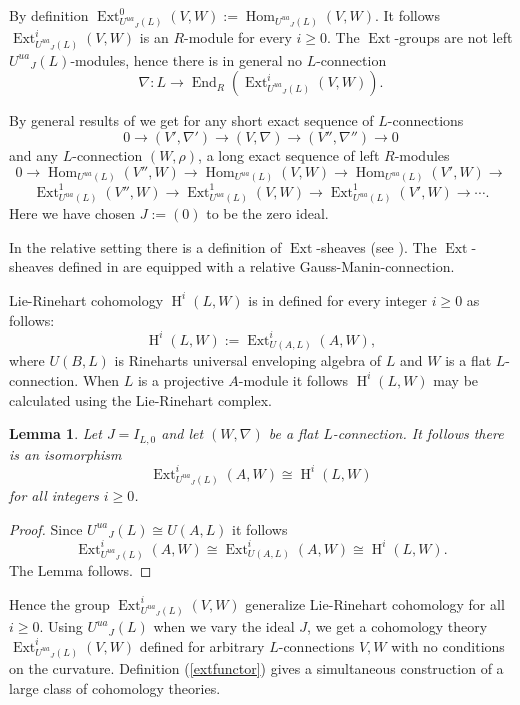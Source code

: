 \documentclass{amsart}
\theoremstyle{plain}
\newtheorem{lemma}[theorem]{Lemma}
\theoremstyle{definition}
\theoremstyle{remark}
\numberwithin{equation}{theorem}
\begin{document}
By definition ${\operatorname{Ext} }^0_{{U^{ua}}_J(L)}(V,W):={\operatorname{Hom} }_{{U^{ua}}_J(L)}(V,W)$.
It follows ${\operatorname{Ext} }^i_{{U^{ua}}_J(L)}(V,W)$ is an ${R}$-module for every $i\geq 0$. 
The ${\operatorname{Ext} }$-groups are not left ${U^{ua}}_J(L)$-modules, hence there is in general no $L$-connection
\[ \nabla:L\rightarrow {\operatorname{End} }_{R}({\operatorname{Ext} }^i_{{U^{ua}}_J(L)}(V,W)).\]

By general results of \cite{cartan} we get for any short exact sequence of $L$-connections
\[ 0 \rightarrow (V', \nabla') \rightarrow (V,\nabla) \rightarrow (V'', \nabla'') \rightarrow 0\]
and any $L$-connection $(W, \rho)$, a long exact sequence of left ${R}$-modules
\[ 0 \rightarrow {\operatorname{Hom} }_{{U^{ua}}(L)}(V'',W)\rightarrow {\operatorname{Hom} }_{{U^{ua}}(L)}(V,W)
\rightarrow {\operatorname{Hom} }_{{U^{ua}}(L)}(V',W)\rightarrow \]
\[ {\operatorname{Ext} }^1_{{U^{ua}}(L)}(V'', W)\rightarrow {\operatorname{Ext} }^1_{{U^{ua}}(L)}(V,W)
\rightarrow {\operatorname{Ext} }^1_{{U^{ua}}(L)}(V', W)\rightarrow \cdots .\]
Here we have chosen $J:=(0)$ to be the zero ideal.

In the relative setting there is a definition of ${\operatorname{Ext} }$-sheaves (see \cite{maa15}). 
The ${\operatorname{Ext} }$-sheaves defined in \cite{maa15} are equipped with a relative Gauss-Manin-connection.

Lie-Rinehart cohomology ${\operatorname{H} }^i(L,W)$ is in \cite{rinehart}  defined for every integer $i\geq 0$ as follows:
\[ {\operatorname{H} }^i(L,W):={\operatorname{Ext} }^i_{U({A},L)}({A},W), \]
where $U(B,L)$ is Rineharts universal enveloping algebra of $L$ and $W$ is a flat $L$-connection.
When $L$ is a projective ${A}$-module it follows ${\operatorname{H} }^i(L,W)$ may be calculated using the Lie-Rinehart complex.

\begin{lemma} Let $J=I_{L,0}$ and 
let $(W,\nabla)$ be a flat $L$-connection. It follows there is an isomorphism
\[ {\operatorname{Ext} }^i_{{U^{ua}}_J(L)}({A},W)\cong {\operatorname{H} }^i(L,W)\]
for all integers $i\geq 0$.
\end{lemma}
\begin{proof} Since ${U^{ua}}_J(L)\cong U({A},L)$ it follows
\[ {\operatorname{Ext} }^i_{{U^{ua}}_J(L)}({A},W)\cong {\operatorname{Ext} }^i_{U({A},L)}({A},W)\cong {\operatorname{H} }^i(L,W).\]
The Lemma follows.
\end{proof}
Hence the group ${\operatorname{Ext} }^i_{{U^{ua}}_J(L)}(V,W)$ generalize Lie-Rinehart cohomology for all $i\geq 0$.
Using ${U^{ua}}_J(L)$ when we vary the ideal $J$, we get a cohomology theory ${\operatorname{Ext} }^i_{{U^{ua}}_J(L)}(V,W)$ defined for 
arbitrary $L$-connections $V,W$ with no conditions on the curvature. Definition (\ref{extfunctor}) 
gives a simultaneous construction of a large class of cohomology theories. 
\end{document}
